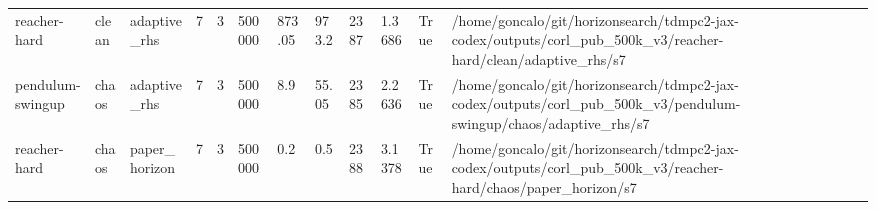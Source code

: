\begin{tabular}{llllllllllll}
reacher-hard & clean & adaptive\_rhs & 7 & 3 & 500000 & 873.05 & 973.2 & 2387 & 1.3686 & True & /home/goncalo/git/horizonsearch/tdmpc2-jax-codex/outputs/corl\_pub\_500k\_v3/reacher-hard/clean/adaptive\_rhs/s7 \\
pendulum-swingup & chaos & adaptive\_rhs & 7 & 3 & 500000 & 8.9 & 55.05 & 2385 & 2.2636 & True & /home/goncalo/git/horizonsearch/tdmpc2-jax-codex/outputs/corl\_pub\_500k\_v3/pendulum-swingup/chaos/adaptive\_rhs/s7 \\
reacher-hard & chaos & paper\_horizon & 7 & 3 & 500000 & 0.2 & 0.5 & 2388 & 3.1378 & True & /home/goncalo/git/horizonsearch/tdmpc2-jax-codex/outputs/corl\_pub\_500k\_v3/reacher-hard/chaos/paper\_horizon/s7 \\
\bottomrule
\end{tabular}
